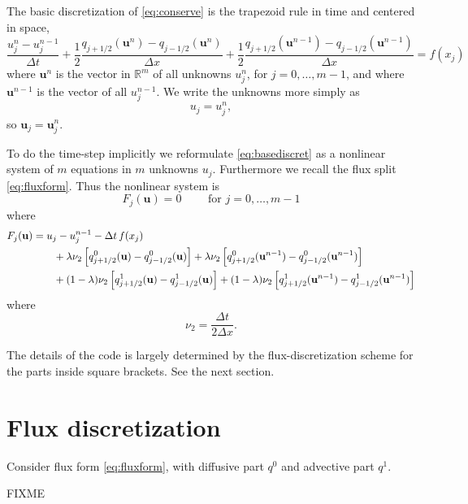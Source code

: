 \documentclass[11pt]{amsart}
\newcommand\bu{\mathbf{u}}
\newcommand\RR{\mathbb{R}}
\begin{document}
The basic discretization of \eqref{eq:conserve} is the trapezoid rule in time and centered in space,
\begin{equation}
\frac{u_j^n - u_j^{n-1}}{\Delta t} + \frac{1}{2} \frac{q_{j+1/2}(\bu^n) - q_{j-1/2}(\bu^n)}{\Delta x} + \frac{1}{2} \frac{q_{j+1/2}(\bu^{n-1}) - q_{j-1/2}(\bu^{n-1})}{\Delta x} = f(x_j) \label{eq:basediscret}
\end{equation}
where $\bu^n$ is the vector in $\RR^m$ of all unknowns $u_j^n$, for $j=0,\dots,m-1$, and where $\bu^{n-1}$ is the vector of all $u_j^{n-1}$.  We write the unknowns more simply as
  $$u_j = u_j^n,$$
so $\bu_j = \bu_j^n$.

To do the time-step implicitly we reformulate \eqref{eq:basediscret} as a nonlinear system of $m$ equations in $m$ unknowns $u_j$.  Furthermore we recall the flux split \eqref{eq:fluxform}.  Thus the nonlinear system is
\begin{equation}
F_j(\bu) = 0 \qquad \text{ for } j = 0,\dots,m-1
\end{equation}
where
\begin{align}
F_j(\bu) &= u_j - u_j^{n-1} - \Delta t\,f(x_j) \\
   &\qquad + \lambda \nu_2 \left[q^0_{j+1/2}(\bu) - q^0_{j-1/2}(\bu)\right] + \lambda \nu_2 \left[q^0_{j+1/2}(\bu^{n-1}) - q^0_{j-1/2}(\bu^{n-1})\right] \notag \\
   &\qquad + (1-\lambda) \nu_2 \left[q^1_{j+1/2}(\bu) -  q^1_{j-1/2}(\bu)\right] + (1-\lambda) \nu_2 \left[q^1_{j+1/2}(\bu^{n-1}) - q^1_{j-1/2}(\bu^{n-1})\right] \notag
\end{align}
where
    $$\nu_2 = \frac{\Delta t}{2\Delta x}.$$

The details of the code is largely determined by the flux-discretization scheme for the parts inside square brackets.  See the next section.

\section{Flux discretization}

Consider flux form \eqref{eq:fluxform}, with diffusive part $q^0$ and advective part $q^1$.

FIXME




%
%
\end{document}
